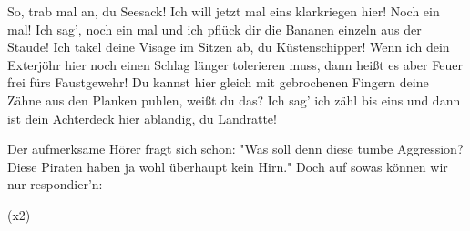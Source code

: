 \begin{guitar}
	So, trab mal an, du Seesack! Ich will jetzt mal eins klarkriegen hier! 
	Noch ein mal! Ich sag', noch ein mal und ich pflück dir die Bananen 
	einzeln aus der Staude! Ich takel deine Visage im Sitzen ab, du 
	Küstenschipper! Wenn ich dein Exterjöhr hier noch einen Schlag 
	länger tolerieren muss, dann heißt es aber Feuer frei fürs Faustgewehr! 
	Du kannst hier gleich mit gebrochenen Fingern deine Zähne aus den 
	Planken puhlen, weißt du das? Ich sag' ich zähl bis eins und dann
	ist dein Achterdeck hier ablandig, du Landratte!
	
	Der aufmerksame Hörer fragt sich schon:
	"Was soll denn diese tumbe Aggression?
	Diese Piraten haben ja wohl überhaupt kein Hirn."
	Doch auf sowas können wir nur respondier'n:
	
	  (x2)
	
\end{guitar}